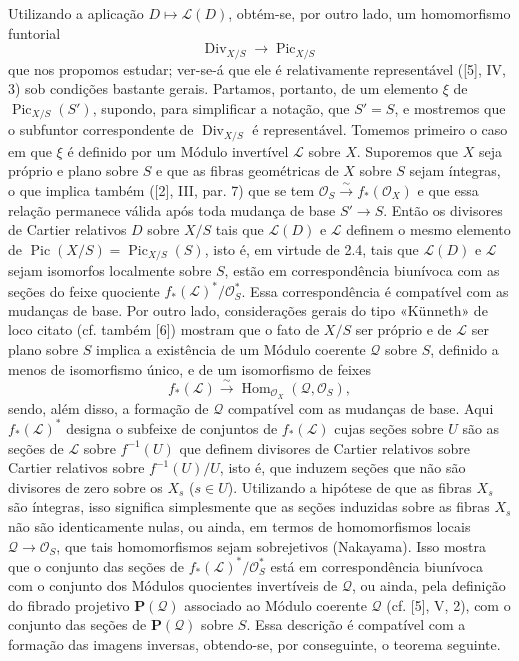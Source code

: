 Utilizando a aplicação $D\longmapsto\mathcal L(D)$, obtém-se, por outro lado,
um homomorfismo funtorial
\begin{equation}
\operatorname{Div}_{X/S}\longrightarrow\operatorname{Pic}_{X/S}
\tag{+}
\end{equation}
que nos propomos estudar; ver-se-á que ele é relativamente representável ([5],
IV, 3) sob condições bastante gerais. Partamos, portanto, de um elemento $\xi$
de $\operatorname{Pic}_{X/S}(S')$, supondo, para simplificar a notação, que
$S'=S$, e mostremos que o subfuntor correspondente de
$\operatorname{Div}_{X/S}$ é representável. Tomemos primeiro o caso em que
$\xi$ é definido por um Módulo invertível $\mathcal L$ sobre $X$. Suporemos
que $X$ seja próprio e plano sobre $S$ e que as fibras geométricas de $X$
sobre $S$ sejam íntegras, o que implica também ([2], III, par. 7) que se tem
$\mathcal O_S\xrightarrow{\sim}f_*(\mathcal O_X)$ e que essa relação permanece
válida após toda mudança de base $S'\longrightarrow S$. Então os divisores de
Cartier relativos $D$ sobre $X/S$ tais que $\mathcal L(D)$ e $\mathcal L$
definem o mesmo elemento de
$\operatorname{Pic}(X/S)=\operatorname{Pic}_{X/S}(S)$, isto é, em virtude de
2.4, tais que $\mathcal L(D)$ e $\mathcal L$ sejam isomorfos localmente sobre
$S$, estão em correspondência biunívoca com as seções do feixe quociente
$f_*(\mathcal L)^*/\mathcal O_S^*$. Essa correspondência é compatível com as
mudanças de base. Por outro lado, considerações gerais do tipo «Künneth» de
loco citato (cf. também [6]) mostram que o fato de $X/S$ ser próprio e de
$\mathcal L$ ser plano sobre $S$ implica a existência de um Módulo coerente
$\mathcal Q$ sobre $S$, definido a menos de isomorfismo único, e de um
isomorfismo de feixes
\[
f_*(\mathcal L)\xrightarrow{\sim}
\operatorname{Hom}_{\mathcal O_X}(\mathcal Q,\mathcal O_S),
\]
 sendo, além disso, a formação de $\mathcal Q$
compatível com as mudanças de base. Aqui $f_*(\mathcal L)^*$ designa o
subfeixe de conjuntos de $f_*(\mathcal L)$ cujas seções sobre $U$ são as
seções de $\mathcal L$ sobre $f^{-1}(U)$ que definem divisores de Cartier
relativos sobre
Cartier relativos sobre $f^{-1}(U)/U$, isto é, que induzem seções que não são
divisores de zero sobre os $X_s$ ($s\in U$). Utilizando a hipótese de que as
fibras $X_s$ são íntegras, isso significa simplesmente que as seções induzidas
sobre as fibras $X_s$ não são identicamente nulas, ou ainda, em termos de
homomorfismos locais $\mathcal Q\longrightarrow\mathcal O_S$, que tais
homomorfismos sejam sobrejetivos (Nakayama). Isso mostra que o conjunto das
seções de $f_*(\mathcal L)^*/\mathcal O_S^*$ está em correspondência biunívoca
com o conjunto dos Módulos quocientes invertíveis de $\mathcal Q$, ou ainda,
pela definição do fibrado projetivo $\mathbf P(\mathcal Q)$ associado ao Módulo
coerente $\mathcal Q$ (cf. [5], V, 2), com o conjunto das seções de
$\mathbf P(\mathcal Q)$ sobre $S$. Essa descrição é compatível com a formação
das imagens inversas, obtendo-se, por conseguinte, o teorema seguinte.

